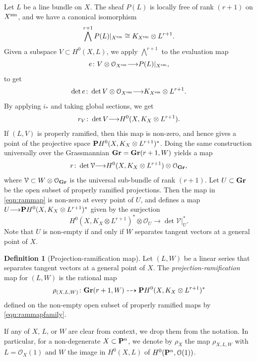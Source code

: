 \documentclass[11pt,reqno]{amsart}
\theoremstyle{plain}
\theoremstyle{definition}
\newtheorem{definition}[theorem]{Definition}
\theoremstyle{remark}
\numberwithin{equation}{section}
\renewcommand{\to}{{\longrightarrow}}
\numberwithin{equation}{section}
\renewcommand{\O}{\mathcal O}
\begin{document}
Let $L$ be a line bundle on $X$.
The sheaf $P(L)$ is locally free of rank $(r+1)$ on $X^{\rm sm}$, and we have a canonical isomorphism
\[ \bigwedge^{r+1} P(L) |_{X^{\rm sm}} \cong K_{X^{\rm sm}} \otimes L^{r+1}.\]
Given a subspace $V \subset H^0(X, L)$, we apply $\bigwedge^{r+1}$ to the evaluation map
\[ e \from V \otimes \O_{X^{\rm sm}} \to P(L)|_{X^{\rm sm}},\]
to get
\[ \det e \from \det V \otimes \O_{X^{\rm sm}} \to K_{X^{\rm sm}} \otimes L^{r+1}. \]
By applying $i_*$ and taking global sections, we get
\begin{equation}\label{eqn:ramsection}
  r_V \from \det V \to H^0(X, K_X \otimes L^{r+1}).
\end{equation}
If $(L, V)$ is properly ramified, then this map is non-zero, and hence gives a point of the projective space $\P H^0(X, K_X \otimes L^{r+1})^*$.
Doing the same construction universally over the Grassmannian $\Gr = \Gr(r+1, W)$ yields a map
\begin{equation}\label{eqn:rammap}
  r \from \det \mathcal V \to H^0(X, K_X \otimes L^{r+1}) \otimes \O_{\Gr},
\end{equation}
where $\mathcal V \subset W \otimes \O_{\Gr}$ is the universal sub-bundle of rank $(r+1)$.
Let $U \subset \Gr$ be the open subset of properly ramified projections.
Then the map in \eqref{eqn:rammap} is non-zero at every point of $U$, and defines a map $U \to \P H^0(X, K_X \otimes L^{r+1})^*$ given by the surjection
\begin{equation}\label{eqn:rammapfamily}
  H^0(X, K_X \otimes L^{r+1})^* \otimes \O_{U} \to \det \mathcal V|_U^*.
\end{equation}
Note that $U$ is non-empty if and only if $W$ separates tangent vectors at a general point of $X$.
\begin{definition}[Projection-ramification map]
  \label{def:ProjectionRamification}
  Let $(L, W)$ be a linear series that separates tangent vectors at a general point of $X$.
  The \emph{projection-ramification} map for $(L,W)$ is the rational map
  \[
    \rho_{(X,L,W)} \from \Gr(r+1, W) \dashrightarrow \P H^0(X, K_X \otimes L^{r+1})^*
  \]
  defined on the non-empty open subset of properly ramified maps by \eqref{eqn:rammapfamily}.
\end{definition}
If any of $X$, $L$, or $W$ are clear from context, we drop them from the notation.
In particular, for a non-degenerate $X \subset \P^n$, we denote by $\rho_X$ the map $\rho_{X,L,W}$  with $L = \O_X(1)$ and $W$ the image in $H^0(X, L)$ of $H^0(\P^n, \O(1))$.
\end{document}
